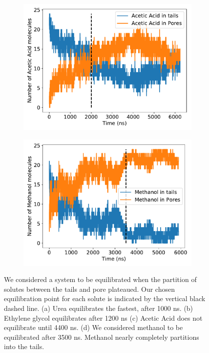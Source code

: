 \documentclass{article}
\begin{document}
\begin{figure}
\begin{subfigure}{0.45\textwidth}
  \caption{}\label{fig:GCL_equilibration}
  \end{subfigure}
  \begin{subfigure}{0.45\textwidth}
  \includegraphics[width=\textwidth]{ACH_equilibration.pdf}
  \caption{}\label{fig:ACH_equilibration}
  \end{subfigure}
  \begin{subfigure}{0.45\textwidth}
  \includegraphics[width=\textwidth]{MET_equilibration.pdf}
  \caption{}\label{fig:MET_equilibration}
  \end{subfigure}
  \caption{We considered a system to be equilibrated when the partition of solutes
  between the tails and pore plateaued. Our chosen equilibration point for each
  solute is indicated by the vertical black dashed line. (a) Urea equilibrates
  the fastest, after 1000 ns. (b) Ethylene glycol equilibrates after 1200 ns 
  (c) Acetic Acid does not equilibrate until 4400 ns. (d) We considered methanol
  to be equilibrated after 3500 ns. Methanol nearly completely partitions into
  the tails.}\label{fig:equilibration}
  \end{figure}
\end{document}
